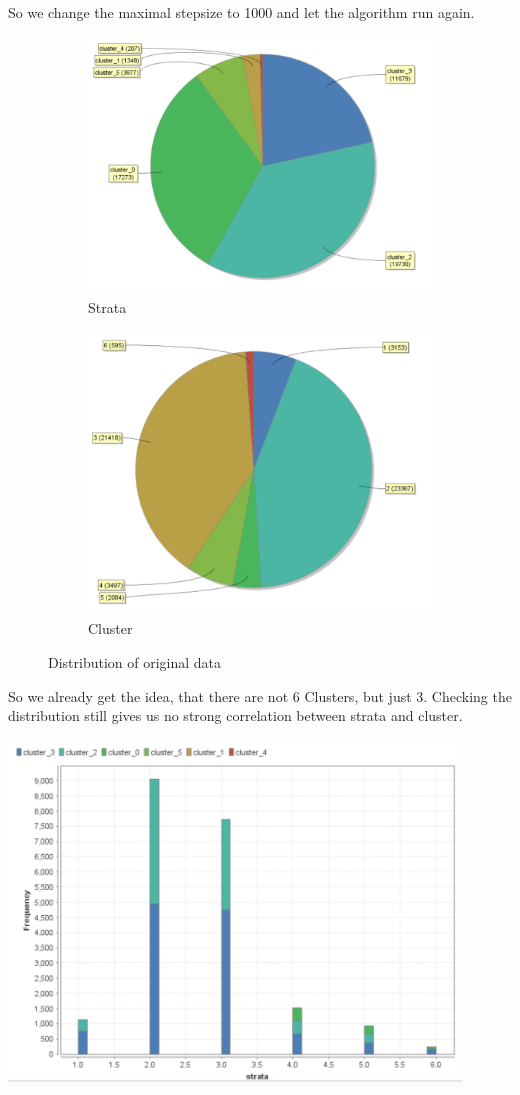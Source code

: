 So we change the maximal stepsize to 1000 and let the algorithm run again.

\begin{figure}[h]
\centering
\begin{subfigure}{.5\textwidth}
  \centering
  \includegraphics[width=.4\linewidth]{vectorclusteringcluster1000.PNG}
  \caption{Strata}
  \label{fig:OrgSt}
\end{subfigure}%
\begin{subfigure}{.5\textwidth}
  \centering
  \includegraphics[width=.4\linewidth]{vectorclusteringstrata.PNG}
  \caption{Cluster}
  \label{fig:OrgCl}
\end{subfigure}
\caption{Distribution of original data}
\label{fig:OrgDist}
\end{figure}

So we already get the idea, that there are not 6 Clusters, but just 3. Checking the distribution still gives us no strong correlation between strata and cluster.

\includegraphics[width=0.9\textwidth]{vectorClustering1000}

